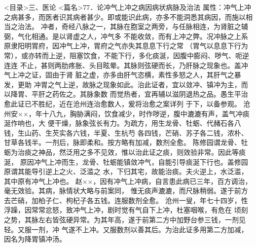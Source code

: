 \documentclass[a4paper,12pt,UTF8,twoside]{ctexbook}
\begin{document}
<目录>三、医论
<篇名>77．论冲气上冲之病因病状病脉及治法
属性：冲气上冲之病甚多，而医者识其病者甚少。即或能识此病，亦多不能洞悉其病因，而施以相当之治法。 
冲者，奇经八脉之一，其脉在胞室之两旁，与任脉相连，为肾脏之辅弼，气化相通。是以肾虚之人，冲气多 
不能收敛，而有上冲之弊。况冲脉之上系原隶阳明胃府，因冲气上冲，胃府之气亦失其息息下行之常 
（胃气以息息下行为常），或亦转而上逆，阻塞饮食，不能下行，多化痰涎，因腹中膨闷、哕气、呃逆连连 
不止，甚则两肋疼胀、头目眩晕。其脉则弦硬而长，乃肝脉之现象也。盖冲气上冲之证，固由于肾 
脏之虚，亦多由肝气恣横，素性多怒之人，其肝气之暴发，更助 
冲胃之气上逆，故脉之现象如此。治此证者，宜以敛冲、镇冲为主，而以降胃、平肝之药佐之。其脉象数 
而觉热者，宜再辅以滋阴退热之品。愚生平治愈此证已不胜纪，近在沧州连治愈数人，爰将治愈之案详列 
于下，以备参观。 
沧州安××，年十八九，胸胁满闷，饮食减少，时作哕逆，腹中漉漉有声，盖气冲痰涎作响也，大 
便干燥，脉象弦长有力。为疏方，用生龙骨、牡蛎、代赭石各八钱，生山药、生芡实各六钱，半夏、生杭芍 
各四钱，芒硝、苏子各二钱，浓朴、甘草各钱半。一剂后，脉即柔和。按方略有加减，数剂全愈。 
陈修园谓龙骨、牡蛎为治痰之神品，然泛用之多不见效，惟以治此证之痰，则效验非常。因此等痰涎， 
原因冲气上冲而生，龙骨、牡蛎能镇敛冲气，自能引导痰涎下行也。盖修园原谓其能导引逆上之火、泛滥之 
水，下归其宅，故能治痰。夫火逆上，水泛滥，其中原有冲气上冲也。 
赵××，因有冲气上冲病，自言患此病已三年，百方调治，毫无效验。其病，脉情状大略与前案同， 
惟无痰声漉漉，而尺脉稍弱。遂于前方去芒硝，加柏子仁、枸杞子各五钱。连服数剂全愈。 
沧州一叟，年七十四岁，性浮躁，因常常忿怒，致冲气上冲，剧时觉有气自下上冲，杜塞咽喉，有危在 
顷刻之势，其脉左右皆弦硬异常。为其年高，遂于前第二方中加野台参三钱，一剂见轻。又服一剂，冲 
气遂不上冲。又服数剂以善其后。为治此证多用第二方加减，因名为降胃镇冲汤。 
\end{document}
